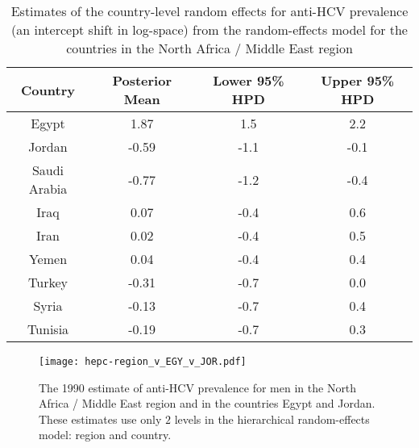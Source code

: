     \begin{table}[h]
        \caption[Estimates of the country-level random effects for anti-HCV
          prevalence]{Estimates of the country-level random effects for anti-HCV
          prevalence (an intercept shift in log-space) from the random-effects
          model for the countries in the North Africa / Middle
          East region}
        \label{tab:app-hepc regional rfx}
        \begin{center}
        \begin{tabular}{|c|c|c|c|}
            \hline
                Country & Posterior Mean & Lower 95\% HPD  & Upper 95\%  HPD \\
            \hline
                Egypt	&	1.87	&	 1.5	&	2.2	\\
                Jordan	&	-0.59	&	-1.1	&	-0.1 \\
                Saudi Arabia	&	-0.77	&	-1.2	&	-0.4 \\
                Iraq	&	0.07	&	-0.4	&	0.6	\\
                Iran	&	0.02	&	-0.4	&	0.5	\\
                Yemen	&	0.04	&	-0.4	&	0.4	\\
                Turkey	&	-0.31	&	-0.7	&	0.0	\\
                Syria	&	-0.13	&	-0.7	&	0.4	\\
                Tunisia	&	-0.19	&	-0.7	&	0.3	\\
            \hline
        \end{tabular}
        \end{center}
    \end{table}

    \begin{figure}[h]
        \begin{center}
            \texttt{[image: hepc-region\_v\_EGY\_v\_JOR.pdf]}
            \caption[Estimates of anti-HCV prevalence in North Africa / Middle East 
              region and in the countries Egypt and Jordan.]{The 1990 estimate of 
              anti-HCV prevalence for
              men in the North Africa / Middle East region and in
              the countries Egypt and Jordan.  These estimates
              use only $2$ levels in the hierarchical random-effects
              model: region and country.}
            \label{fig:app-hepc regional rfx}
        \end{center}
    \end{figure}

